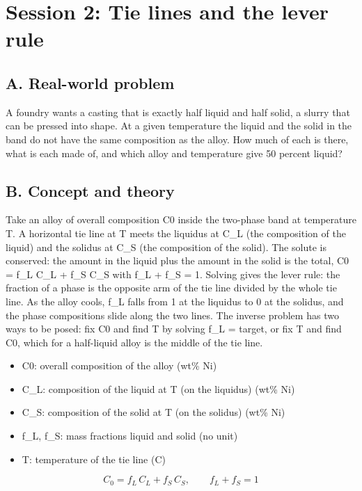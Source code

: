 \documentclass[11pt,a4paper]{article}
\begin{document}
\section{Session 2: Tie lines and the lever rule}

\subsection*{A. Real-world problem}
A foundry wants a casting that is exactly half liquid and half solid, a slurry that can be pressed into shape. At a given temperature the liquid and the solid in the band do not have the same composition as the alloy. How much of each is there, what is each made of, and which alloy and temperature give 50 percent liquid?

\subsection*{B. Concept and theory}
Take an alloy of overall composition C0 inside the two-phase band at temperature T. A horizontal tie line at T meets the liquidus at C\_L (the composition of the liquid) and the solidus at C\_S (the composition of the solid). The solute is conserved: the amount in the liquid plus the amount in the solid is the total, C0 = f\_L C\_L + f\_S C\_S with f\_L + f\_S = 1. Solving gives the lever rule: the fraction of a phase is the opposite arm of the tie line divided by the whole tie line. As the alloy cools, f\_L falls from 1 at the liquidus to 0 at the solidus, and the phase compositions slide along the two lines. The inverse problem has two ways to be posed: fix C0 and find T by solving f\_L = target, or fix T and find C0, which for a half-liquid alloy is the middle of the tie line.

\begin{itemize}[nosep]
\item C0: overall composition of the alloy (wt\% Ni)
\item C\_L: composition of the liquid at T (on the liquidus) (wt\% Ni)
\item C\_S: composition of the solid at T (on the solidus) (wt\% Ni)
\item f\_L, f\_S: mass fractions liquid and solid (no unit)
\item T: temperature of the tie line (C)
\end{itemize}

\begin{equation*}
C_0 = f_L\,C_L + f_S\,C_S,\qquad f_L+f_S=1
\end{equation*}
\end{document}
